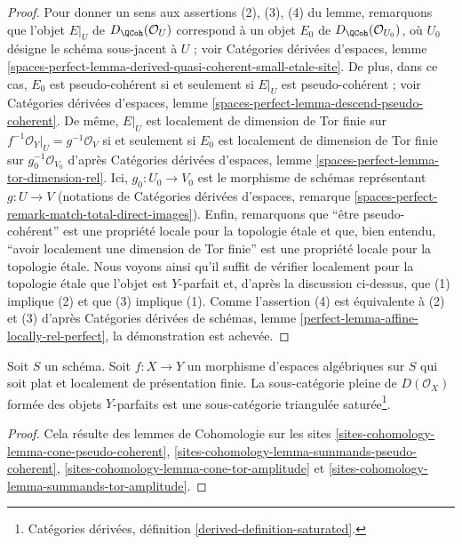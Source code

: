 \begin{proof}
Pour donner un sens aux assertions (2), (3), (4) du lemme, remarquons que
l'objet $E|_U$ de $D_\QCoh(\mathcal{O}_U)$ correspond à
un objet $E_0$ de $D_\QCoh(\mathcal{O}_{U_0})$, où $U_0$
désigne le schéma sous-jacent à $U$ ; voir Catégories dérivées d'espaces,
lemme \ref{spaces-perfect-lemma-derived-quasi-coherent-small-etale-site}.
De plus, dans ce cas, $E_0$ est pseudo-cohérent si et seulement si
$E|_U$ est pseudo-cohérent ; voir Catégories dérivées d'espaces,
lemme \ref{spaces-perfect-lemma-descend-pseudo-coherent}.
De même, $E|_U$ est localement de dimension de Tor finie sur
$f^{-1}\mathcal{O}_Y|_U = g^{-1}\mathcal{O}_V$ si et seulement si
$E_0$ est localement de dimension de Tor finie sur $g_0^{-1}\mathcal{O}_{V_0}$
d'après Catégories dérivées d'espaces, lemme
\ref{spaces-perfect-lemma-tor-dimension-rel}.
Ici, $g_0 : U_0 \to V_0$ est le morphisme de schémas représentant
$g : U \to V$ (notations de Catégories dérivées d'espaces,
remarque \ref{spaces-perfect-remark-match-total-direct-images}).
Enfin, remarquons que ``être pseudo-cohérent'' est une propriété locale pour la topologie \'etale et
que, bien entendu, ``avoir localement une dimension de Tor finie'' est une propriété locale pour la topologie \'etale.
Nous voyons ainsi qu'il suffit de vérifier localement pour la topologie \'etale que l'objet est $Y$-parfait
et, d'après la discussion ci-dessus, que (1) implique (2) et que
(3) implique (1). Comme l'assertion (4) est équivalente
à (2) et (3) d'après
Catégories dérivées de schémas, lemme
\ref{perfect-lemma-affine-locally-rel-perfect},
la démonstration est achevée.
\end{proof}

\begin{lemma}
\label{lemma-triangulated}
Soit $S$ un schéma. Soit $f : X \to Y$ un morphisme
d'espaces algébriques sur $S$ qui soit plat et localement de présentation finie.
La sous-catégorie pleine de $D(\mathcal{O}_X)$ formée des objets $Y$-parfaits est
une sous-catégorie triangulée saturée\footnote{Catégories dérivées, définition
\ref{derived-definition-saturated}.}.
\end{lemma}

\begin{proof}
Cela résulte des lemmes de Cohomologie sur les sites
\ref{sites-cohomology-lemma-cone-pseudo-coherent},
\ref{sites-cohomology-lemma-summands-pseudo-coherent},
\ref{sites-cohomology-lemma-cone-tor-amplitude} et
\ref{sites-cohomology-lemma-summands-tor-amplitude}.
\end{proof}

